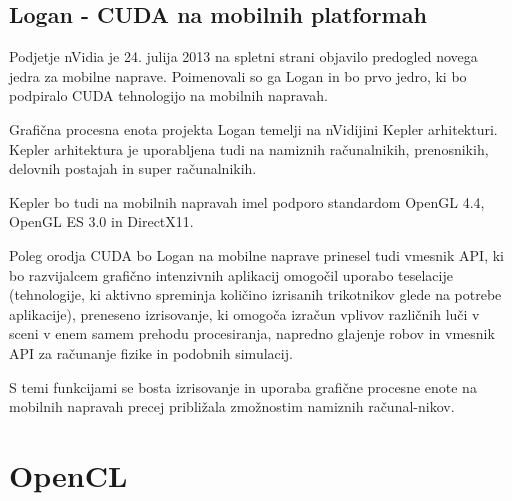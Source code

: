 \subsection{Logan - CUDA na mobilnih platformah}




Podjetje nVidia je 24. julija 2013 \cite{cuda-mobile} na spletni strani objavilo predogled novega jedra za mobilne naprave. Poimenovali so ga Logan in bo prvo jedro, ki bo podpiralo CUDA tehnologijo na mobilnih napravah.

Grafična procesna enota projekta Logan temelji na nVidijini Kepler arhitekturi. Kepler arhitektura je uporabljena tudi na namiznih računalnikih, prenosnikih, delovnih postajah in super računalnikih.

Kepler bo tudi na mobilnih napravah imel podporo standardom OpenGL 4.4, OpenGL ES 3.0 in DirectX11.

Poleg orodja CUDA bo Logan na mobilne naprave prinesel tudi vmesnik API, ki bo razvijalcem grafično intenzivnih aplikacij omogočil uporabo teselacije (tehnologije, ki aktivno spreminja količino izrisanih trikotnikov glede na potrebe aplikacije), preneseno izrisovanje, ki omogoča izračun vplivov različnih luči v sceni v enem samem prehodu procesiranja, napredno glajenje robov in vmesnik API za računanje fizike in podobnih simulacij.

S temi funkcijami se bosta izrisovanje in uporaba grafične procesne enote na mobilnih napravah precej približala zmožnostim namiznih računal-nikov. 
 

\section{OpenCL}

